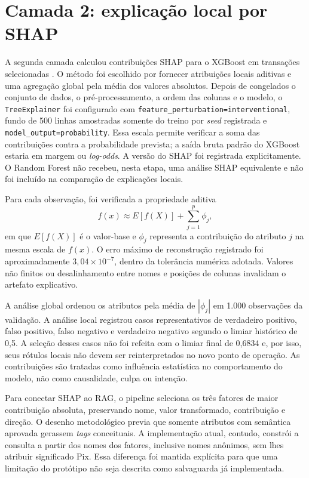 \section{Camada 2: explicação local por SHAP}

A segunda camada calculou contribuições SHAP para o XGBoost em transações selecionadas \cite{lundberg2017unified}. O método foi escolhido por fornecer atribuições locais aditivas e uma agregação global pela média dos valores absolutos. Depois de congelados o conjunto de dados, o pré-processamento, a ordem das colunas e o modelo, o \texttt{TreeExplainer} foi configurado com \texttt{feature\_perturbation=interventional}, fundo de 500 linhas amostradas somente do treino por \emph{seed} registrada e \texttt{model\_output=probability}. Essa escala permite verificar a soma das contribuições contra a probabilidade prevista; a saída bruta padrão do XGBoost estaria em margem ou \emph{log-odds}. A versão do SHAP foi registrada explicitamente. O Random Forest não recebeu, nesta etapa, uma análise SHAP equivalente e não foi incluído na comparação de explicações locais.

Para cada observação, foi verificada a propriedade aditiva
\begin{equation}
    f(x) \approx E[f(X)] + \sum_{j=1}^{p} \phi_j,
\end{equation}
em que $E[f(X)]$ é o valor-base e $\phi_j$ representa a contribuição do atributo $j$ na mesma escala de $f(x)$. O erro máximo de reconstrução registrado foi aproximadamente $3{,}04 \times 10^{-7}$, dentro da tolerância numérica adotada. Valores não finitos ou desalinhamento entre nomes e posições de colunas invalidam o artefato explicativo.

A análise global ordenou os atributos pela média de $|\phi_j|$ em 1.000 observações da validação. A análise local registrou casos representativos de verdadeiro positivo, falso positivo, falso negativo e verdadeiro negativo segundo o limiar histórico de 0,5. A seleção desses casos não foi refeita com o limiar final de 0,6834 e, por isso, seus rótulos locais não devem ser reinterpretados no novo ponto de operação. As contribuições são tratadas como influência estatística no comportamento do modelo, não como causalidade, culpa ou intenção.

Para conectar SHAP ao RAG, o pipeline seleciona os três fatores de maior contribuição absoluta, preservando nome, valor transformado, contribuição e direção. O desenho metodológico previa que somente atributos com semântica aprovada gerassem \emph{tags} conceituais. A implementação atual, contudo, constrói a consulta a partir dos nomes dos fatores, inclusive nomes anônimos, sem lhes atribuir significado Pix. Essa diferença foi mantida explícita para que uma limitação do protótipo não seja descrita como salvaguarda já implementada.

